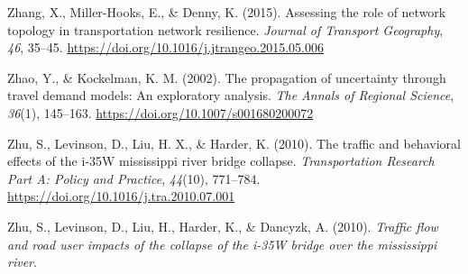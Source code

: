 \documentclass[
  letterpaper,
  number,
  review,
  3p]{elsarticle}
\newlength{\cslhangindent}
\newlength{\cslentryspacingunit} %
\newenvironment{CSLReferences}[2] %
 {%
  \setlength{\parindent}{0pt}
  \ifodd #1
  \let\oldpar\par
  \def\par{\hangindent=\cslhangindent\oldpar}
  \fi
  \setlength{\parskip}{#2\cslentryspacingunit}
 }%
 {}
\begin{document}
\begin{CSLReferences}{1}{0}
\leavevmode{}%
Zhang, X., Miller-Hooks, E., \& Denny, K. (2015). Assessing the role of
network topology in transportation network resilience. \emph{Journal of
Transport Geography}, \emph{46}, 35--45.
\url{https://doi.org/10.1016/j.jtrangeo.2015.05.006}

\leavevmode{}%
Zhao, Y., \& Kockelman, K. M. (2002). The propagation of uncertainty
through travel demand models: An exploratory analysis. \emph{The Annals
of Regional Science}, \emph{36}(1), 145--163.
\url{https://doi.org/10.1007/s001680200072}

\leavevmode{}%
Zhu, S., Levinson, D., Liu, H. X., \& Harder, K. (2010). The traffic and
behavioral effects of the i-35W mississippi river bridge collapse.
\emph{Transportation Research Part A: Policy and Practice},
\emph{44}(10), 771--784. \url{https://doi.org/10.1016/j.tra.2010.07.001}

\leavevmode{}%
Zhu, S., Levinson, D., Liu, H., Harder, K., \& Dancyzk, A. (2010).
\emph{Traffic flow and road user impacts of the collapse of the i-35W
bridge over the mississippi river}.

\end{CSLReferences}
\end{document}

